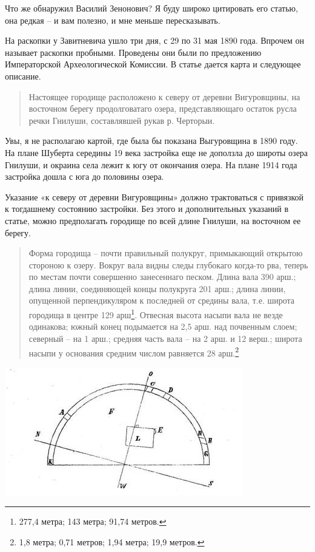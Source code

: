 
Что же обнаружил Василий Зенонович? Я буду широко цитировать его статью, она редкая – и вам полезно, и мне меньше пересказывать.

На раскопки у Завитневича ушло три дня, с 29 по 31 мая 1890 года. Впрочем он называет раскопки пробными. Проведены они были по предложению Императорской Археологической Комиссии. В статье дается карта и следующее описание.

\begin{quotation}
Настоящее городище расположено к северу от деревни Вигуровщины, на восточном берегу продолговатаго озера, представляющаго остаток русла речки Гнилуши, составлявшей рукав р. Черторыи. 
\end{quotation}

Увы, я не располагаю картой, где была бы показана Выгуровщина в 1890 году. На плане Шуберта середины 19 века застройка еще не доползла до широты озера Гнилуши, и окраина села лежит к югу от окончания озера. На плане 1914 года застройка дошла с юга до половины озера.

Указание «к северу от деревни Вигуровщины» должно трактоваться с привязкой к тогдашнему состоянию застройки. Без этого и дополнительных указаний в статье, можно предполагать городище по всей длине Гнилуши, на восточном ее берегу.

\begin{quotation}
Форма городища – почти правильный полукруг, примыкающий открытою стороною к озеру. Вокруг вала видны следы глубокаго когда-то рва, теперь по местам почти совершенно занесеннаго песком. Длина вала 390 арш.; длина линии, соединяющей концы полукруга 201 арш.; длина линии, опущенной перпендикуляром к последней от средины вала, т.е. широта городища в центре 129 арш\footnote{277,4 метра; 143 метра; 91,74 метров.}. Отвесная высота насыпи вала не везде одинакова; южный конец подымается на 2,5 арш. над почвенным слоем; северный – на 1 арш.; средняя часть вала – на 2 арш. и 12 верш.; широта насыпи у основания средним числом равняется 28 арш.\footnote{1,8 метра; 0,71 метров; 1,94 метра; 19,9 метров.}
\end{quotation}

\begin{center}
\includegraphics[width=\linewidth]{chast-gorodki/radunka/zavitn.jpg}
\end{center}

